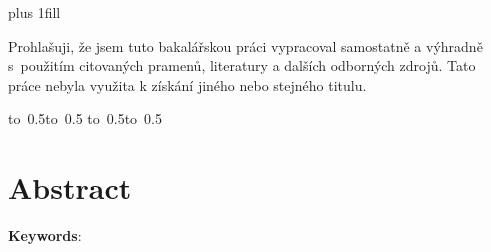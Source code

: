 \newpage

\openright
\hypersetup{pageanchor=true}
\pagestyle{plain}
\vglue 0pt plus 1fill

\noindent
Prohlašuji, že jsem tuto bakalářskou práci vypracoval samostatně a výhradně
s~použitím citovaných pramenů, literatury a dalších odborných zdrojů.
Tato práce nebyla využita k získání jiného nebo stejného titulu.
%

\vspace{10mm}


\hbox{\hbox to 0.5\hbox to 0.5\hsize{\dotfill\quad}}
\smallskip
\hbox{\hbox to 0.5\hsize{}\hbox to 0.5}

\vspace{20mm}
\newpage


\openright

\noindent
\Dedication

\newpage


\openright

\section*{Abstract}

\Abstract

\vspace{5mm}

\noindent\textbf{Keywords}:
\Keywords

\newpage

